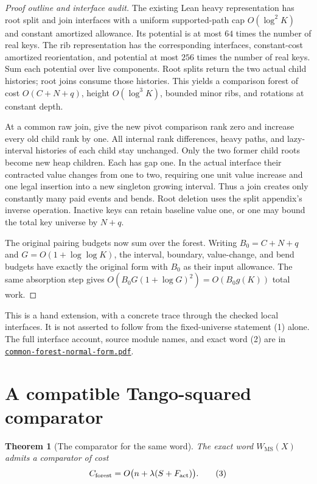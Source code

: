 \documentclass[11pt]{article}
\newtheorem{theorem}{Theorem}
\newcommand{\MS}{\operatorname{MS}}
\begin{document}
\begin{proof}[Proof outline and interface audit]
The existing Lean heavy representation has root split and join
interfaces with a uniform supported-path cap $O(\log^2 K)$ and
constant amortized allowance. Its potential is at most $64$ times
the number of real keys. The rib representation has the corresponding
interfaces, constant-cost amortized reorientation, and potential at
most $256$ times the number of real keys. Sum each potential over
live components. Root splits return the two actual child histories;
root joins consume those histories. This yields a comparison forest
of cost $O(C+N+q)$, height $O(\log^3 K)$, bounded minor ribs, and
rotations at constant depth.

At a common raw join, give the new pivot comparison rank zero and
increase every old child rank by one. All internal rank differences,
heavy paths, and lazy-interval histories of each child stay unchanged.
Only the two former child roots become new heap children. Each has
gap one. In the actual interface their contracted value changes from
one to two, requiring one unit value increase and one legal insertion
into a new singleton growing interval. Thus a join creates only
constantly many paid events and bends. Root deletion uses the split
appendix's inverse operation. Inactive keys can retain baseline value
one, or one may bound the total key universe by $N+q$.

The original pairing budgets now sum over the forest. Writing
$B_0=C+N+q$ and $G=O(1+\log\log K)$, the interval, boundary,
value-change, and bend budgets have exactly the original form with
$B_0$ as their input allowance. The same absorption step gives
$O(B_0G(1+\log G)^2)=O(B_0g(K))$ total work.
\end{proof}

This is a hand extension, with a concrete trace through the checked
local interfaces. It is not asserted to follow from the fixed-universe
statement (1) alone. The full interface account, source module names,
and exact word (2) are in
\href{common-forest-normal-form.pdf}{\texttt{common-forest-normal-form.pdf}}.

\section{A compatible Tango-squared comparator}

\begin{theorem}[The comparator for the same word]\label{thm:comparator}
The exact word $W_{\MS}(X)$ admits a comparator of cost
\[
 C_{\rm forest}=O\bigl(n+\lambda(S+F_{\rm act})\bigr).
                                                               \tag{3}
\]
\end{theorem}
\end{document}
